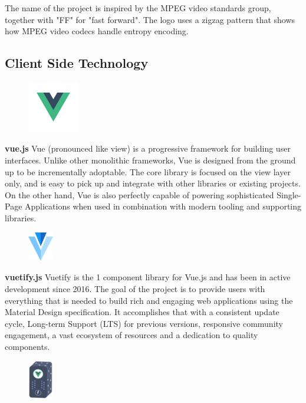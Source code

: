 	The name of the project is inspired by the MPEG video standards group, together with "FF" for "fast forward". The logo uses a zigzag pattern that shows how MPEG video codecs handle entropy encoding.
	\subsection{Client Side Technology}
	\begin{figure}
		\centering
		\vspace{-30pt}
		\includegraphics[width=0.20\textwidth]{vue.png}
		\vspace{-40pt}
	\end{figure}
	\vs
	\textbf{\Large vue.js}
	\vs
	Vue (pronounced like view) is a progressive framework for building user interfaces. Unlike other monolithic frameworks, Vue is designed from the ground up to be incrementally adoptable. The core library is focused on the view layer only, and is easy to pick up and integrate with other libraries or existing projects. On the other hand, Vue is also perfectly capable of powering sophisticated Single-Page Applications when used in combination with modern tooling and supporting libraries.
	\vs[1.5]
	\begin{figure}
		\centering
		\vspace{-40pt}
		\includegraphics[width=0.10\textwidth]{vuetify.png}
		\vspace{-10pt}
	\end{figure}
	\vs
	\textbf{\Large vuetify.js}
	\vs
	Vuetify is the 1 component library for Vue.js and has been in active development since 2016. The goal of the project is to provide users with everything that is needed to build rich and engaging web applications using the Material Design specification. It accomplishes that with a consistent update cycle, Long-term Support (LTS) for previous versions, responsive community engagement, a vast ecosystem of resources and a dedication to quality components.
		\vs[1.5]
	\begin{figure}
		\centering
		\vspace{-30pt}
		\includegraphics[width=0.10\textwidth]{vuex.png}
		\vspace{-10pt}
	\end{figure}
